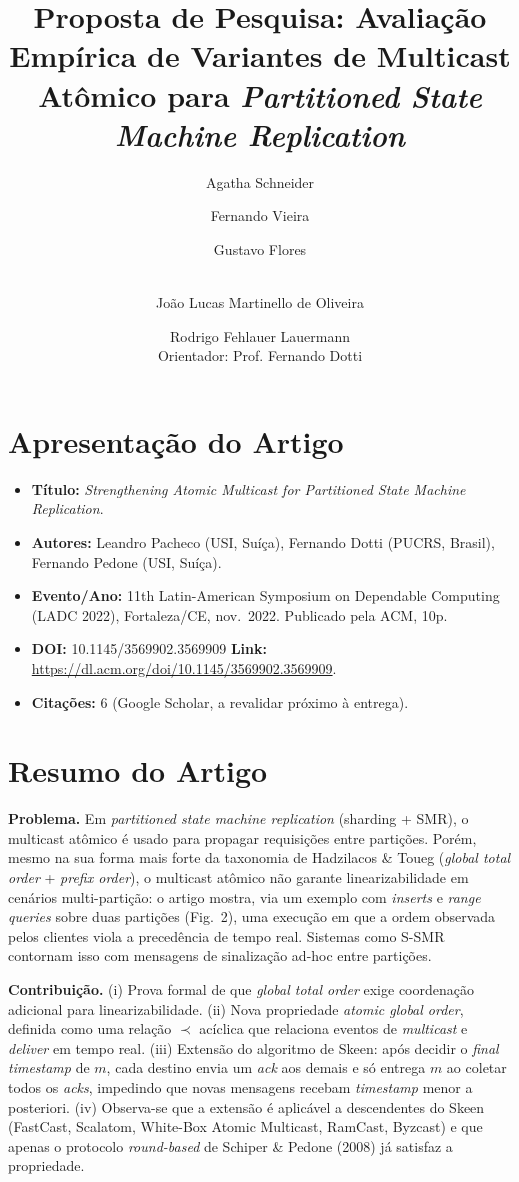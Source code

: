 \documentclass[10pt,a4paper]{article}
\title{\vspace{-1.5em}Proposta de Pesquisa: Avaliação Empírica de Variantes de Multicast Atômico para \textit{Partitioned State Machine Replication}}
\author{Agatha Schneider \and Fernando Vieira \and Gustavo Flores \and\\
João Lucas Martinello de Oliveira \and Rodrigo Fehlauer Lauermann\\[2pt]
\small Orientador: Prof. Fernando Dotti}
\date{\vspace{-1em}}
\begin{document}
\maketitle
\vspace{-2em}

\section{Apresentação do Artigo}
\begin{itemize}
    \item \textbf{Título:} \textit{Strengthening Atomic Multicast for Partitioned State Machine Replication}.
    \item \textbf{Autores:} Leandro Pacheco (USI, Suíça), Fernando Dotti (PUCRS, Brasil), Fernando Pedone (USI, Suíça).
    \item \textbf{Evento/Ano:} 11th Latin-American Symposium on Dependable Computing (LADC 2022), Fortaleza/CE, nov.\ 2022. Publicado pela ACM, 10p.
    \item \textbf{DOI:} 10.1145/3569902.3569909 \quad \textbf{Link:} \url{https://dl.acm.org/doi/10.1145/3569902.3569909}.
    \item \textbf{Citações:} 6 (Google Scholar, a revalidar próximo à entrega).
\end{itemize}

\section{Resumo do Artigo}
\textbf{Problema.} Em \textit{partitioned state machine replication} (sharding + SMR), o multicast atômico é usado para propagar requisições entre partições. Porém, mesmo na sua forma mais forte da taxonomia de Hadzilacos \& Toueg (\textit{global total order} + \textit{prefix order}), o multicast atômico não garante linearizabilidade em cenários multi-partição: o artigo mostra, via um exemplo com \textit{inserts} e \textit{range queries} sobre duas partições (Fig.~2), uma execução em que a ordem observada pelos clientes viola a precedência de tempo real. Sistemas como S-SMR contornam isso com mensagens de sinalização ad-hoc entre partições.

\textbf{Contribuição.} (i) Prova formal de que \textit{global total order} exige coordenação adicional para linearizabilidade. (ii) Nova propriedade \textit{atomic global order}, definida como uma relação $\prec$ acíclica que relaciona eventos de \textit{multicast} e \textit{deliver} em tempo real. (iii) Extensão do algoritmo de Skeen: após decidir o \textit{final timestamp} de $m$, cada destino envia um \textit{ack} aos demais e só entrega $m$ ao coletar todos os \textit{acks}, impedindo que novas mensagens recebam \textit{timestamp} menor a posteriori. (iv) Observa-se que a extensão é aplicável a descendentes do Skeen (FastCast, Scalatom, White-Box Atomic Multicast, RamCast, Byzcast) e que apenas o protocolo \textit{round-based} de Schiper \& Pedone (2008) já satisfaz a propriedade.
\end{document}
